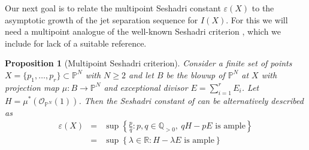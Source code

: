 \documentclass[12pt, reqno]{amsart}
\numberwithin{equation}{section}
\def\e{\ensuremath{\varepsilon}}
\renewcommand{\P}{{\mathbb P}}
\newcommand{\Q}{{\mathbb Q}}
\newcommand{\R}{{\mathbb R}}
\theoremstyle{plain} %
\newtheorem{prop}[thm]{Proposition}
\theoremstyle{definition}
\theoremstyle{remark}
\begin{document}
Our next goal is to relate the multipoint Seshadri constant $\e(X)$ to the asymptotic growth of the jet separation sequence for $I(X)$. For this we will need a multipoint analogue of the well-known Seshadri criterion \cite[Theorem 1.4.13]{Laz04}, which we include for lack of a suitable reference. 


\begin{prop}[Multipoint Seshadri criterion]
\label{prop:ample}
Consider  a finite  set of points  $X=\{p_1,\ldots, p_r\}\subset \mathbb{P}^N$ with $N\geq 2$ and let $B$ be the blowup of $\mathbb{P}^N$ at $X$ with projection map $\mu:B \to \mathbb{P}^N$ and exceptional divisor $E=\sum_{i=1}^r E_i$. Let $H=\mu^*(\mathcal{O}_{\P^N}(1))$. Then the Seshadri constant  of  can be alternatively described as
\begin{eqnarray}
\label{eq:Seshadriample}
\e(X) &=& \sup \left\{ \frac{p}{q} : p,q\in \Q_{>0},  \ qH-p E \text{ is ample}\right \} \nonumber\\
&=&\sup \left\{ \lambda\in\R :  H-\lambda E \text{ is ample}\right \}
\end{eqnarray}
\end{prop}
\end{document}
